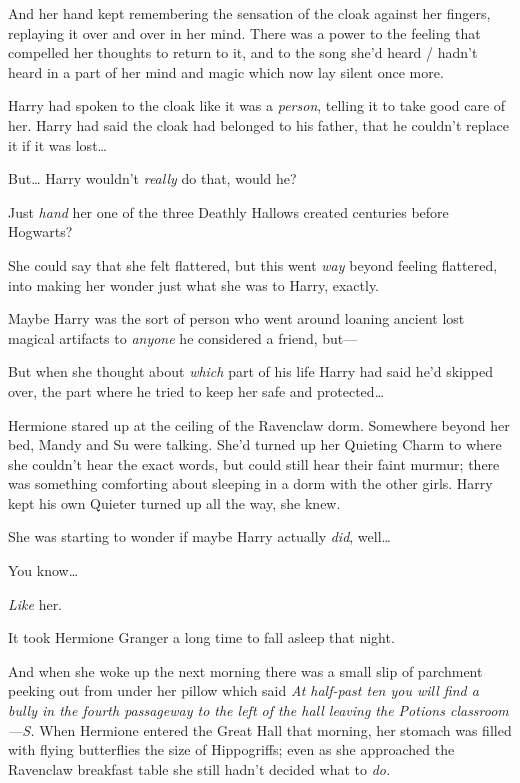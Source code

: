 And her hand kept remembering the sensation of the cloak against her fingers,
replaying it over and over in her mind. There was a power to the feeling that
compelled her thoughts to return to it, and to the song she'd heard / hadn't
heard in a part of her mind and magic which now lay silent once more.

Harry had spoken to the cloak like it was a \emph{person}, telling it to take
good care of her. Harry had said the cloak had belonged to his father, that he
couldn't replace it if it was lost{\ldots}

But{\ldots} Harry wouldn't \emph{really} do that, would he?

Just \emph{hand} her one of the three Deathly Hallows created centuries before
Hogwarts?

She could say that she felt flattered, but this went \emph{way} beyond feeling
flattered, into making her wonder just what she was to Harry, exactly.

Maybe Harry was the sort of person who went around loaning ancient lost magical
artifacts to \emph{anyone} he considered a friend, but---

But when she thought about \emph{which} part of his life Harry had said he'd
skipped over, the part where he tried to keep her safe and protected{\ldots}

Hermione stared up at the ceiling of the Ravenclaw dorm. Somewhere beyond her
bed, Mandy and Su were talking. She'd turned up her Quieting Charm to where she
couldn't hear the exact words, but could still hear their faint murmur; there
was something comforting about sleeping in a dorm with the other girls. Harry
kept his own Quieter turned up all the way, she knew.

She was starting to wonder if maybe Harry actually \emph{did}, well{\ldots}

You know{\ldots}

\emph{Like} her.

It took Hermione Granger a long time to fall asleep that night.

And when she woke up the next morning there was a small slip of parchment
peeking out from under her pillow which said \emph{At half-past ten you will
find a bully in the fourth passageway to the left of the hall leaving the
Potions classroom---S.}
\later
When Hermione entered the Great Hall that morning, her stomach was filled with
flying butterflies the size of Hippogriffs; even as she approached the
Ravenclaw breakfast table she still hadn't decided what to \emph{do.}

